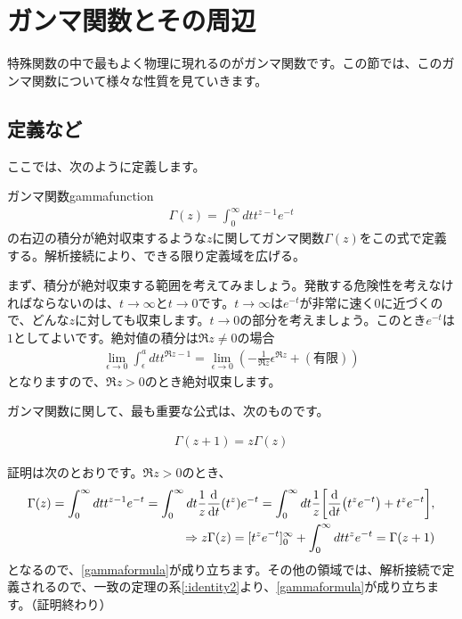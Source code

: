 \documentclass[report,paper=a4, fontsize=12pt, line_length=16cm, number_of_lines=33,dvipdfmx]{jlreq}
\newenvironment{important}{\begin{tcolorbox}[
  colback = white,
  colframe = red!35,
  boxrule = 2mm,
  fonttitle = \bfseries,
  after = \noindent] }{\end{tcolorbox}}
\numberwithin{equation}{section}
\begin{document}
\chapter{ガンマ関数とその周辺}
特殊関数の中で最もよく物理に現れるのがガンマ関数です。この節では、このガンマ関数について様々な性質を見ていきます。
\section{定義など}
ここでは、次のように定義します。
\begin{definition}{ガンマ関数}{gammafunction}
\begin{align}
  \Gamma(z)=\int_0^{\infty}dt t^{z-1}e^{-t}\label{eulerintegral}
\end{align}
の右辺の積分が絶対収束するような$z$に関してガンマ関数$\Gamma(z)$をこの式で定義する。解析接続により、できる限り定義域を広げる。
\end{definition}

まず、積分が絶対収束する範囲を考えてみましょう。発散する危険性を考えなければならないのは、$t\to\infty$と$t\to 0$です。$t\to\infty$は$e^{-t}$が非常に速く$0$に近づくので、どんな$z$に対しても収束します。$t\to 0$の部分を考えましょう。このとき$e^{-t}$は$1$としてよいです。絶対値の積分は$\Re z\ne 0$の場合
\begin{align}
  \lim_{\epsilon\to 0}\int_{\epsilon}^{a}dt t^{\Re z-1}=\lim_{\epsilon\to 0}(-\frac{1}{\Re z}\epsilon^{\Re z}+(\text{有限}) )
\end{align}
となりますので、$\Re z>0$のとき絶対収束します。

ガンマ関数に関して、最も重要な公式は、次のものです。
\begin{important}
  \begin{align}
    \Gamma(z+1)=z\Gamma(z)\label{gammaformula}
  \end{align}
\end{important}
証明は次のとおりです。$\Re z >0$のとき、
\begin{align}
  \Gamma(z)
  =\int_0^{\infty}dt t^{z-1}e^{-t}
  =\int_0^{\infty}dt \frac{1}{z}\dv{t}(t^{z})e^{-t}
  =\int_0^{\infty}dt \frac{1}{z}\qty[\dv{t}(t^{z}e^{-t})+t^ze^{-t}],\\
\Rightarrow
z\Gamma(z)=[t^{z}e^{-t}]_0^{\infty}+\int_0^{\infty}dt t^{z}e^{-t}=\Gamma(z+1)
\end{align}
となるので、\eqref{gammaformula}が成り立ちます。その他の領域では、解析接続で定義されるので、一致の定理の系\ref{:identity2}より、\eqref{gammaformula}が成り立ちます。（証明終わり）
\end{document}
